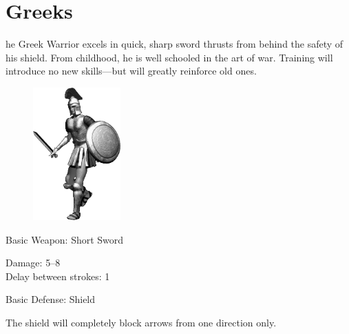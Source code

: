 \clearpage

\section{Greeks}


he Greek Warrior excels in quick, sharp sword thrusts from behind the safety of his shield. From childhood, he is well schooled in the art of war. Training will introduce no new skills---but will greatly reinforce old ones.

\begin{figure}
	\begin{center}
		\vspace{-20pt}
		\includegraphics[width=0.3\textwidth]{Agreek}
	\end{center}
	\vspace{-20pt}
\end{figure}

Basic Weapon: Short Sword
\begin{changemargin}{.5cm}{0cm}
	Damage: 5–8 \\
	Delay between strokes: 1
\end{changemargin}
Basic Defense: Shield
\begin{changemargin}{.5cm}{0cm}
	The shield will completely block arrows from one direction only. \\ \\ \\ \\ \\ \\
\end{changemargin}

